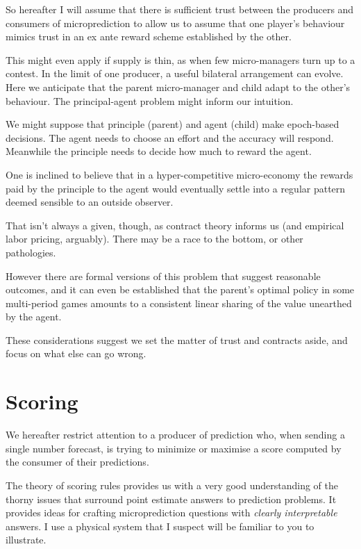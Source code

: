 So hereafter I will assume that there is sufficient trust between the producers and consumers of microprediction to allow us to assume that one player's behaviour mimics trust in an ex ante reward scheme established by the other.   
 
This might even apply if supply is thin, as when few micro-managers turn up to a contest. In the limit of one producer, a useful bilateral arrangement can evolve. Here we anticipate that the parent micro-manager and child adapt to the other's behaviour. The principal-agent problem might inform our intuition. 
 
We might suppose that principle (parent) and agent (child) make epoch-based decisions. The agent needs to choose an effort and the accuracy will respond. Meanwhile the principle needs to decide how much to reward the agent. 

One is inclined to believe that in a hyper-competitive micro-economy the rewards paid by the principle to the agent would eventually settle into a regular pattern deemed sensible to an outside observer.

That isn't always a given, though, as contract theory informs us (and empirical labor pricing, arguably). There may be a race to the bottom, or other pathologies. 

However there are formal versions of this problem that suggest reasonable outcomes, and it can even be established that the parent's optimal policy in some multi-period games amounts to a consistent linear sharing of the value unearthed by the agent.  

These considerations suggest we set the matter of trust and contracts aside, and focus on what else can go wrong.   


\section{Scoring}
\label{sec:scoring_example}

We hereafter restrict attention to a producer of prediction who, when sending a single number forecast, is trying to minimize or maximise a score computed by the consumer of their predictions.  

The theory of scoring rules provides us with a very good understanding of the thorny issues that surround point estimate answers to prediction problems. It provides ideas for crafting microprediction questions with {\em clearly interpretable} answers. I use a physical system that I suspect will be familiar to you to illustrate.  

